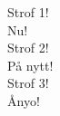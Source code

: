 
            Strof 1! \\
            Nu! \\
            Strof 2! \\
            På nytt! \\
            Strof 3! \\
            Ånyo! \\
